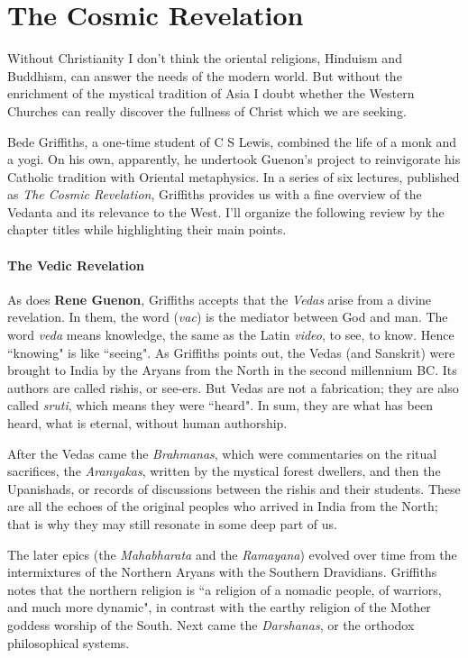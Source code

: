 \section{The Cosmic Revelation}

\begin{quotex}
Without Christianity I don't think the oriental religions, Hinduism and Buddhism, can answer the needs of the modern world. But without the enrichment of the mystical tradition of Asia I doubt whether the Western Churches can really discover the fullness of Christ which we are seeking. 

\end{quotex}
Bede Griffiths, a one-time student of C S Lewis, combined the life of a monk and a yogi. On his own, apparently, he undertook Guenon's project to reinvigorate his Catholic tradition with Oriental metaphysics. In a series of six lectures, published as \emph{The Cosmic Revelation}, Griffiths provides us with a fine overview of the Vedanta and its relevance to the West. I'll organize the following review by the chapter titles while highlighting their main points.

\paragraph{The Vedic Revelation}
As does \textbf{Rene Guenon}, Griffiths accepts that the \emph{Vedas} arise from a divine revelation. In them, the word (\emph{vac}) is the mediator between God and man. The word \emph{veda} means knowledge, the same as the Latin \emph{video}, to see, to know. Hence ``knowing" is like ``seeing". As Griffiths points out, the Vedas (and Sanskrit) were brought to India by the Aryans from the North in the second millennium BC. Its authors are called rishis, or see-ers. But Vedas are not a fabrication; they are also called \emph{sruti}, which means they were ``heard". In sum, they are what has been heard, what is eternal, without human authorship.

After the Vedas came the \emph{Brahmanas}, which were commentaries on the ritual sacrifices, the \emph{Aranyakas}, written by the mystical forest dwellers, and then the Upanishads, or records of discussions between the rishis and their students. These are all the echoes of the original peoples who arrived in India from the North; that is why they may still resonate in some deep part of us.

The later epics (the \emph{Mahabharata} and the \emph{Ramayana}) evolved over time from the intermixtures of the Northern Aryans with the Southern Dravidians. Griffiths notes that the northern religion is ``a religion of a nomadic people, of warriors, and much more dynamic", in contrast with the earthy religion of the Mother goddess worship of the South. Next came the \emph{Darshanas}, or the orthodox philosophical systems.

